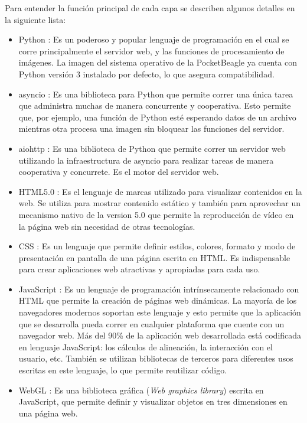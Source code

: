    Para entender la función principal de cada capa se describen algunos detalles en la siguiente lista:
   \begin{itemize}
      \item{Python \citep{WEBSITE:python}: Es un poderoso y popular lenguaje de programación en el cual se corre principalmente el servidor web, y las funciones de procesamiento de imágenes. La imagen del sistema operativo de la PocketBeagle ya cuenta con Python versión 3 instalado por defecto, lo que asegura compatibilidad.
      }
      \item{asyncio \citep{WEBSITE:asyncio}: Es una biblioteca para Python que permite correr una única tarea que administra muchas de manera concurrente y cooperativa.
      Esto permite que, por ejemplo, una función de Python esté esperando datos de un archivo mientras otra procesa una imagen sin bloquear las funciones del servidor.
      }
      \item{aiohttp \citep{WEBSITE:aiohttp}: Es una biblioteca de Python que permite correr un servidor web utilizando la infraestructura de asyncio para realizar tareas de manera cooperativa y concurrete.
      Es el motor del servidor web.
      }
      \item{HTML5.0 \citep{WEBSITE:html5}: Es el lenguaje de marcas utilizado para visualizar contenidos en la web.
         Se utiliza para mostrar contenido estático y también para aprovechar un mecanismo nativo de la version 5.0 que permite la reproducción de vídeo en la página web sin necesidad de otras tecnologías.
      }
      \item{CSS \citep{WEBSITE:css}: Es un lenguaje que permite definir estilos, colores, formato y modo de presentación en pantalla de una página escrita en HTML.
      Es indispensable para crear aplicaciones web atractivas y apropiadas para cada uso.
      }
      \item{JavaScript \citep{WEBSITE:javascript}: Es un lenguaje de programación intrínsecamente relacionado con HTML que permite la creación de páginas web dinámicas.
         La mayoría de los navegadores modernos soportan este lenguaje y esto permite que la aplicación que se desarrolla pueda correr en cualquier plataforma que cuente con un navegador web.
         Más del 90\% de la aplicación web desarrollada está codificada en lenguaje JavaScript: los cálculos de alineación, la interacción con el usuario, etc.
         También se utilizan bibliotecas de terceros para diferentes usos escritas en este lenguaje, lo que permite reutilizar código.
      }
      \item{WebGL \citep{WEBSITE:webgl}: Es una biblioteca gráfica (\textit{Web graphics library}) escrita en JavaScript, que permite definir y visualizar objetos en tres dimensiones en una página web.
}
\end{itemize}
